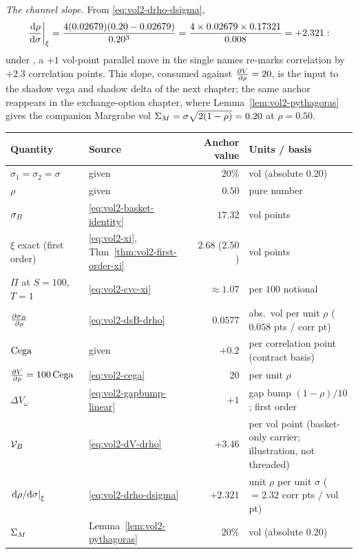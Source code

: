 \begin{example}
\emph{The channel slope.} From \eqref{eq:vol2-drho-dsigma},
\[
\left.\frac{\mathrm{d} \rho}{\mathrm{d} \sigma}\right|_{\xi}
 = \frac{4(0.02679)(0.20 - 0.02679)}{0.20^3}
 = \frac{4 \times 0.02679 \times 0.17321}{0.008}
 = +2.321 :
\]
under \stickycvc, a $+1$ vol-point parallel move in the single names
re-marks correlation by $+2.3$ correlation points. This slope, consumed
against $\frac{\partial V}{\partial \rho} = 20$, is the input to the shadow vega and shadow
delta of the next chapter; the same anchor reappears in the exchange-option
chapter, where Lemma~\ref{lem:vol2-pythagoras} gives the companion Margrabe
vol $\Sigma_M = \sigma\sqrt{2(1-\rho)} = 0.20$ at $\rho = 0.50$.
\end{example}

\begin{table}[htbp]
\centering
\begin{tabular}{@{}llrl@{}}
\toprule
Quantity & Source & Anchor value & Units / basis \\
\midrule
$\sigma_1 = \sigma_2 = \sigma$ & given & $20\%$ & vol (absolute $0.20$) \\
$\rho$ & given & $0.50$ & pure number \\
$\sigma_B$ & \eqref{eq:vol2-basket-identity} & $17.32$ & vol points \\
$\xi$ exact (first order) & \eqref{eq:vol2-xi}, Thm~\ref{thm:vol2-first-order-xi} & $2.68$ ($2.50$) & vol points \\
$\Pi$ at $S = 100$, $T = 1$ & \eqref{eq:vol2-cvc-xi} & $\approx 1.07$ & per $100$ notional \\
$\frac{\partial \sigma_B}{\partial \rho}$ & \eqref{eq:vol2-dsB-drho} & $0.0577$ & abs.\ vol per unit $\rho$ ($0.058$ pts / corr pt) \\
$\mathrm{Cega}$ & given & $+0.2$ & per correlation point (contract basis) \\
$\frac{\partial V}{\partial \rho} = 100\,\mathrm{Cega}$ & \eqref{eq:vol2-cega} & $20$ & per unit $\rho$ \\
$\Delta V_{\omega}$ & \eqref{eq:vol2-gapbump-linear} & $+1$ & gap bump $(1-\rho)/10$; first order \\
$\mathcal{V}_B$ & \eqref{eq:vol2-dV-drho} & $+3.46$ & per vol point (basket-only carrier; illustration, not threaded) \\
$\left.\mathrm{d}\rho/\mathrm{d}\sigma\right|_{\xi}$ & \eqref{eq:vol2-drho-dsigma} & $+2.321$ & unit $\rho$ per unit $\sigma$ ($= 2.32$ corr pts / vol pt) \\
$\Sigma_M$ & Lemma~\ref{lem:vol2-pythagoras} & $20\%$ & vol (absolute $0.20$) \\
\bottomrule
\end{tabular}

\end{table}

